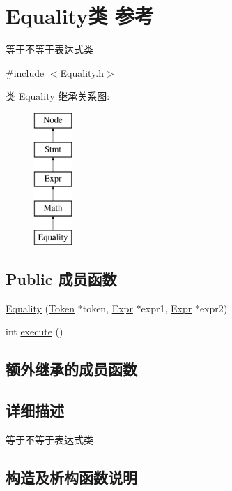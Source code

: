\hypertarget{class_equality}{}\section{Equality类 参考}
\label{class_equality}


等于不等于表达式类  




{\ttfamily \#include $<$Equality.\+h$>$}

类 Equality 继承关系图\+:\begin{figure}[H]
\begin{center}
\leavevmode
\includegraphics[height=5.000000cm]{class_equality}
\end{center}
\end{figure}
\subsection*{Public 成员函数}
\begin{DoxyCompactItemize}
\item 
\hyperlink{class_equality_afe12b1491ae42b80d41a8355bfe3197c}{Equality} (\hyperlink{class_token}{Token} $\ast$token, \hyperlink{class_expr}{Expr} $\ast$expr1, \hyperlink{class_expr}{Expr} $\ast$expr2)
\item 
int \hyperlink{class_equality_a0255c33af70613b006b03a329ed329ff}{execute} ()
\end{DoxyCompactItemize}
\subsection*{额外继承的成员函数}


\subsection{详细描述}
等于不等于表达式类 

\subsection{构造及析构函数说明}
\mbox{\label{class_equality_afe12b1491ae42b80d41a8355bfe3197c}} 

